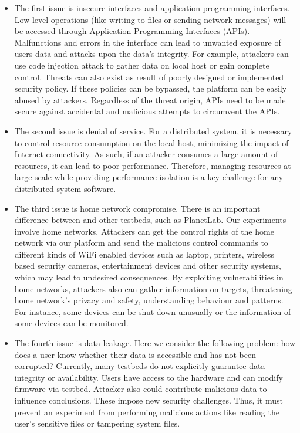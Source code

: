 \begin{itemize}
\item The first issue is insecure interfaces and application programming interfaces. Low-level operations (like writing to files or sending network messages) will be accessed through Application Programming Interfaces (APIs). Malfunctions and errors in the interface can lead to unwanted exposure of users data and attacks upon the data's integrity. For example, attackers can use code injection attack to gather data on local host or gain complete control. Threats can also exist as result of poorly designed or implemented security policy. If these policies can be bypassed, the platform can be easily abused by attackers. Regardless of the threat origin, APIs need to be made secure against accidental and malicious attempts to circumvent the APIs.

\item The second issue is denial of service. For a distributed system, it is necessary to control resource consumption on the local host, minimizing the impact of Internet connectivity. As such, if an attacker consumes a large amount of resources, it can lead to poor performance. Therefore, managing resources at large scale while providing performance isolation is a key challenge for any distributed system software.

\item The third issue is home network compromise. There is an important difference between \sysname and other testbeds, such as PlanetLab. Our experiments involve home networks. Attackers can get the control rights of the home network via our platform and send the malicious control commands to different kinds of WiFi enabled devices such as laptop, printers, wireless based security cameras, entertainment devices and other security systems, which may lead to undesired consequences. By exploiting vulnerabilities in home networks, attackers also can gather information on targets, threatening home network's privacy and safety, understanding behaviour and patterns. For instance, some devices can be shut down unusually or the information of some devices can be monitored.

\item The fourth issue is data leakage. Here we consider the following problem: how does a user know whether their data is accessible and has not been corrupted? Currently, many testbeds do not explicitly guarantee data integrity or availability. Users have access to the hardware and can modify firmware via testbed. Attacker also could contribute malicious data to influence conclusions. These impose new security challenges. Thus, it must prevent an experiment from performing malicious actions like reading the user's sensitive files or tampering system files.
\end{itemize}